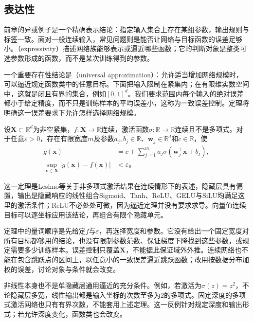 \subsection{表达性}
\label{sec:ffn-expressivity}

前章的异或例子是一个精确表示结论：指定输入集合上存在某组参数，输出规则与标签一致。面对一般连续输入，常见问题则是能否让网络与目标函数的误差足够小。（expressivity）描述网络族能够表示或逼近哪些函数；它的判断对象是整类可选参数形成的函数，而不是某次训练得到的参数。

一个重要存在性结论是（universal approximation）：允许适当增加网络规模时，可以逼近规定函数类中的任意目标。下面把输入限制在紧集内；在有限维实数空间中，这就是闭且有界的集合，例如$[0,1]^d$。我们要求范围内每个输入的绝对误差都小于给定精度，而不只是训练样本的平均误差小，这称为一致误差控制。定理将明确这一误差要求下允许怎样选择网络规模。

\begin{theorem}[单隐藏层的通用逼近]
  \label{thm:ffn-universal-approximation}
  设$\bm{X}\subset\mathbb{R}^{d}$为非空紧集，$f:\bm{X}\to\mathbb{R}$连续，激活函数$\sigma:\mathbb{R}\to\mathbb{R}$连续且不是多项式。对于任意$\varepsilon>0$，存在有限宽度$m$及参数$a_j,b_j\in\mathbb{R}$、$\bm{w}_j\in\mathbb{R}^{d}$和$c\in\mathbb{R}$，使
  \begin{equation}
    \begin{aligned}
      g(\bm{x})&=c+\sum_{j=1}^{m}a_j\sigma(\bm{w}_j^{\top}\bm{x}+b_j),\\
      \sup_{\bm{x}\in\bm{X}}|g(\bm{x})-f(\bm{x})|&<\varepsilon\text{。}
    \end{aligned}
    \label{eq:ffn-universal-approximation}
  \end{equation}
\end{theorem}

这一定理是Leshno等关于非多项式激活结果在连续情形下的表述，隐藏层具有偏置，输出是隐藏响应的线性组合Sigmoid、Tanh、ReLU、GELU与SiLU均满足这里的激活条件；ReLU不必处处可微，因为逼近定理并没有要求求导。向量值连续目标可以逐坐标应用该结论，再组合有限个隐藏单元。

定理中的量词顺序是先给定$f$与$\varepsilon$，再选择宽度和参数。它没有给出一个固定宽度对所有目标都够用的结论，也没有限制参数范数、保证梯度下降找到这些参数，或规定需要多少训练样本。误差控制只覆盖$\bm{X}$，不能据此保证域外外推。连续网络也不能在包含跳跃点的区间上，以任意小的一致误差逼近跳跃函数；改用按数据分布加权的误差，讨论对象与条件就会改变。

非线性本身也不是单隐藏层通用逼近的充分条件。例如，若激活为$\sigma(z)=z^2$，不论隐藏层多宽，线性输出都是输入坐标的次数至多为$2$的多项式。固定深度的多项式激活网络也只有有界次数，不能套用上述定理。这一反例针对规定深度和输出形式；若允许深度变化，函数类也会改变。


